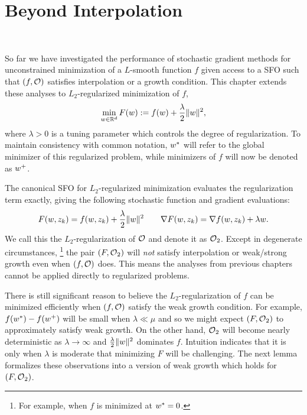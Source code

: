 
\chapter{Beyond Interpolation}~\label{ch:beyond-interpolation}

So far we have investigated the performance of stochastic gradient methods for unconstrained minimization of a \( L \)-smooth function \( f \) given access to a \ac{SFO} \oracle{} such that \( \rbr{f, \oracle{}} \) satisfies interpolation or a growth condition. 
This chapter extends these analyses to \( L_2 \)-regularized minimization of \( f \), 
\begin{align}
    \min_{\w \in \R^d} F(\w) := f(\w) + \frac{\lambda}{2} \norm{\w}^2,\label{eq:l2-reguarlized-problem}
\end{align}
where \( \lambda > 0 \) is a tuning parameter which controls the degree of regularization. 
To maintain consistency with common notation, \( \wopt \) will refer to the global minimizer of this regularized problem, while minimizers of \( f \) will now be denoted as \( \wbar \).

The canonical \ac{SFO} for \( L_2 \)-regularized minimization evaluates the regularization term exactly, giving the following stochastic function and gradient evaluations: 
\[ F(\w, \zk) = f(\w, \zk) + \frac{\lambda}{2} \norm{\w}^2 \quad \quad \nabla F(\w, \zk) = \grad(\w, \zk) + \lambda \w.  \]
We call this the \( L_2 \)-regularization of \( \oracle{} \) and denote it as \( \oracle{}_2 \).
Except in degenerate circumstances,%
\footnote{For example, when \( f \) is minimized at \( \wopt = 0 \).}%
the pair \( \rbr{F, \oracle{}_2} \) will \emph{not} satisfy interpolation or weak/strong growth even when \( \rbr{f, \oracle{}} \) does. 
This means the analyses from previous chapters cannot be applied directly to regularized problems.

There is still significant reason to believe the \( L_2 \)-regularization of \( f \) can be minimized efficiently when \( \rbr{f, \oracle{}} \) satisfy the weak growth condition.
For example, \( f(\wopt) - f(\wbar) \) will be small when \( \lambda \ll \mu \) and so we might expect \( \rbr{F, \oracle{}_2} \) to approximately satisfy weak growth. 
On the other hand, \( \oracle{}_2 \) will become nearly deterministic as \( \lambda \rightarrow \infty \) and \( \frac{\lambda}{2} \norm{\w}^2 \) dominates \( f \).
Intuition indicates that it is only when \( \lambda \) is moderate that minimizing \( F \) will be challenging.
The next lemma formalizes these observations into a version of weak growth which holds for \( \rbr{F, \oracle{}_2} \).


